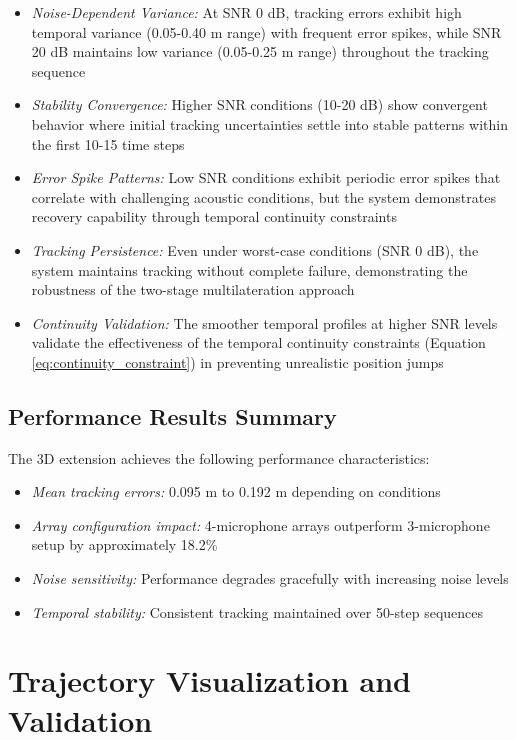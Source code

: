 \documentclass[a4paper]{article}
\begin{document}
\begin{itemize}
\item {\em Noise-Dependent Variance:} At SNR 0 dB, tracking errors exhibit high temporal variance (0.05-0.40 m range) with frequent error spikes, while SNR 20 dB maintains low variance (0.05-0.25 m range) throughout the tracking sequence
\item {\em Stability Convergence:} Higher SNR conditions (10-20 dB) show convergent behavior where initial tracking uncertainties settle into stable patterns within the first 10-15 time steps
\item {\em Error Spike Patterns:} Low SNR conditions exhibit periodic error spikes that correlate with challenging acoustic conditions, but the system demonstrates recovery capability through temporal continuity constraints
\item {\em Tracking Persistence:} Even under worst-case conditions (SNR 0 dB), the system maintains tracking without complete failure, demonstrating the robustness of the two-stage multilateration approach
\item {\em Continuity Validation:} The smoother temporal profiles at higher SNR levels validate the effectiveness of the temporal continuity constraints (Equation \ref{eq:continuity_constraint}) in preventing unrealistic position jumps
\end{itemize}

\subsection{Performance Results Summary}

The 3D extension achieves the following performance characteristics:

\begin{itemize}
\item {\em Mean tracking errors:} 0.095 m to 0.192 m depending on conditions
\item {\em Array configuration impact:} 4-microphone arrays outperform 3-microphone setup by approximately 18.2\%
\item {\em Noise sensitivity:} Performance degrades gracefully with increasing noise levels
\item {\em Temporal stability:} Consistent tracking maintained over 50-step sequences
\end{itemize}

\section{Trajectory Visualization and Validation}
\end{document}
